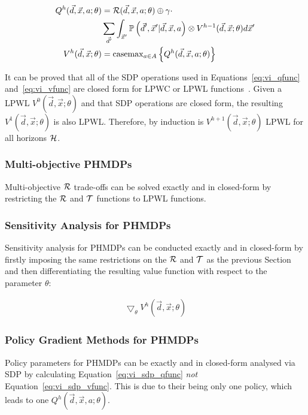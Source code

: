 {\footnotesize 
    \abovedisplayskip=0pt
    \belowdisplayskip=0pt
    \begin{align}
        Q^{h}(\vec{d}, \vec{x}, a; \theta) &= \mathcal{R}(\vec{d}, \vec{x}, a; \theta) \oplus \gamma \cdot  \nonumber \\ 
        & \sum_{\vec{d}'} \int_{\vec{x}'} \mathbb{P}\left({\vec{d}', \vec{x}' | \vec{d}, \vec{x}, a}\right) \otimes V^{h-1}(\vec{d}, \vec{x}; \theta) d\vec{x}' \label{eq:vi_sdp_qfunc} \\
        V^{h}(\vec{d}, \vec{x}; \theta) &= \mathrm{casemax}_{a \in A} \left\{ Q^{h}(\vec{d}, \vec{x}, a; \theta) \right\} \label{eq:vi_sdp_vfunc}
    \end{align}
}%

It can be proved that all of the SDP operations used in Equations~\eqref{eq:vi_qfunc} and~\eqref{eq:vi_vfunc} are closed form for LPWC or LPWL functions~\parencite{Sanner_UAI_2011,Zamani_AAAI_2012}. Given a LPWL {\footnotesize $V^{0}(\vec{d}, \vec{x}; \theta)$} and that SDP operations are closed form, the resulting {\footnotesize $V^{1}(\vec{d}, \vec{x}; \theta)$} is also LPWL. Therefore, by induction is {\footnotesize $V^{h+1}(\vec{d}, \vec{x}; \theta)$} LPWL for all horizons {\footnotesize $ \mathcal{H} $}.

\subsubsection{Multi-objective PHMDPs}

Multi-objective {\footnotesize $\mathcal{R}$} trade-offs can be solved exactly and in closed-form by restricting the {\footnotesize $\mathcal{R}$} and {\footnotesize $\mathcal{T}$} functions to LPWL functions.

\subsubsection{Sensitivity Analysis for PHMDPs}

Sensitivity analysis for PHMDPs can be conducted exactly and in closed-form by firstly imposing the same restrictions on the {\footnotesize $\mathcal{R}$} and {\footnotesize $\mathcal{T}$} as the previous Section and then differentiating the resulting value function with respect to the parameter {\footnotesize $\theta$}: 

{\footnotesize
    \abovedisplayskip=0pt
    \belowdisplayskip=0pt    
    \begin{align*}
        \bigtriangledown_\theta V^{h}(\vec{d}, \vec{x}; \theta)
    \end{align*}
}%

\subsubsection{Policy Gradient Methods for PHMDPs}

Policy parameters for PHMDPs can be exactly and in closed-form analysed via SDP by calculating Equation~\eqref{eq:vi_sdp_qfunc} \textit{not} Equation~\eqref{eq:vi_sdp_vfunc}. This is due to their being only one policy, which leads to one {\footnotesize $ Q^{h}(\vec{d}, \vec{x}, a; \theta) $}.

